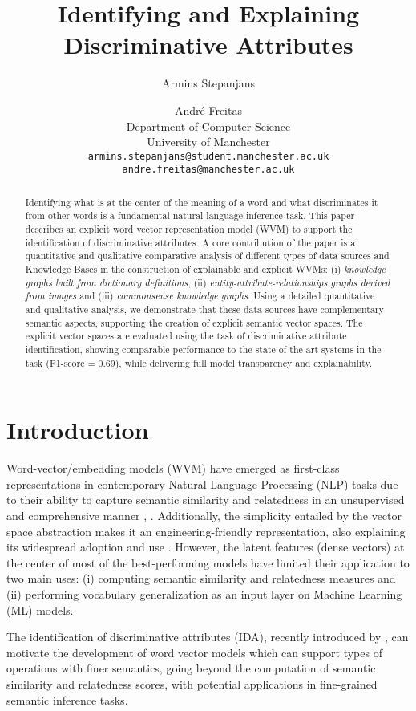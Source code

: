 \documentclass[11pt,a4paper]{article}
\title{Identifying and Explaining Discriminative Attributes}
\author{Armins Stepanjans \and Andr\'e Freitas\\
       Department of Computer Science \\
       University of Manchester\\
       \texttt{armins.stepanjans@student.manchester.ac.uk} \\
       \texttt{andre.freitas@manchester.ac.uk}
}
\date{}
\begin{document}
\maketitle
\begin{abstract}
Identifying what is at the center of the meaning of a word and what discriminates it from other words is a fundamental natural language inference task. This paper describes an explicit word vector representation model (WVM) to support the identification of discriminative attributes. A core contribution of the paper is a quantitative and qualitative comparative analysis of different types of data sources and Knowledge Bases in the construction of explainable and explicit WVMs: (i) \textit{knowledge graphs built from dictionary definitions}, (ii) \textit{entity-attribute-relationships graphs derived from images} and (iii) \textit{commonsense knowledge graphs}. Using a detailed quantitative and qualitative analysis, we demonstrate that these data sources have complementary semantic aspects, supporting the creation of explicit semantic vector spaces. The explicit vector spaces are evaluated using the task of discriminative attribute identification, showing comparable performance to the state-of-the-art systems in the task (F1-score = 0.69), while delivering full model transparency and explainability.
\end{abstract}

\section{Introduction}

Word-vector/embedding models (WVM) have emerged as first-class representations in contemporary Natural Language Processing (NLP) tasks due to their ability to capture semantic similarity and relatedness in an unsupervised and comprehensive manner \cite{turney2010frequency}, \cite{freitas2015schema}. Additionally, the simplicity entailed by the vector space abstraction makes it an engineering-friendly representation, also explaining its widespread adoption and use \cite{freitas2015schema}. However, the latent features (dense vectors) at the center of most of the best-performing models have limited their application to two main uses: (i) computing semantic similarity and relatedness measures and (ii) performing vocabulary generalization as an input layer on Machine Learning (ML) models.

The identification of discriminative attributes (IDA), recently introduced by \citet{semeval2018task10}, can motivate the development of word vector models which can support types of operations with finer semantics, going beyond the computation of semantic similarity and relatedness scores, with potential applications in fine-grained semantic inference tasks.
\end{document}

